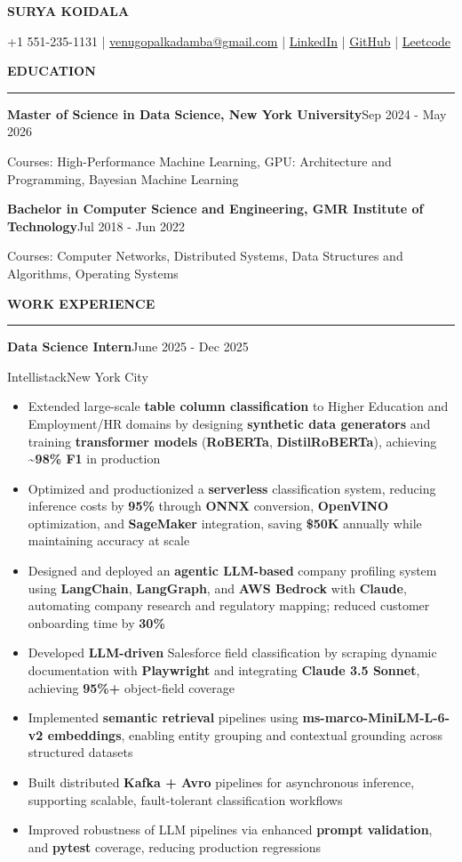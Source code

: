 \documentclass[9pt]{article}
\newcommand{\resumeSection}[1]{%
  \vspace{2pt}%
  \textbf{#1}\par
  \vspace{-5pt}%
  \rule{\linewidth}{0.3pt}\par
  \vspace{0pt}%
}
\newcommand{\resumeRole}[4]{%
  \textbf{#1}\hfill #2\par
  #3\hfill #4\par
}
\newcommand{\resumeSubline}[1]{%
  #1\par
}
\newcommand{\kw}[1]{\textbf{#1}}
\begin{document}
\begin{center}
  {\large \textbf{SURYA  KOIDALA}}\par
  \vspace{0pt}
  +1 551-235-1131 | \href{venugopalkadamba@gmail.com}{venugopalkadamba@gmail.com} | \href{https://linkedin.com/in/venugopalkadamba}{LinkedIn} | \href{http://github.com/venugopalkadamba}{GitHub} | \href{https://leetcode.com/u/venugopalkadamba}{Leetcode}
\end{center}

\resumeSection{EDUCATION}

\resumeSubline{\textbf{Master of Science in Data Science, New York University}\hfill Sep 2024 - May 2026}
\resumeSubline{Courses: High-Performance Machine Learning, GPU: Architecture and Programming, Bayesian Machine Learning}
\resumeSubline{\textbf{Bachelor in Computer Science and Engineering, GMR Institute of Technology}\hfill Jul 2018 - Jun 2022}
\resumeSubline{Courses: Computer Networks, Distributed Systems, Data Structures and Algorithms, Operating Systems}

\resumeSection{WORK EXPERIENCE}

\resumeRole{Data Science Intern}{June 2025 - Dec 2025}{Intellistack}{New York City}
\begin{itemize}
  \item Extended large-scale \kw{table column classification} to Higher Education and Employment/HR domains by designing \kw{synthetic data generators} and training \kw{transformer models} (\kw{RoBERTa}, \kw{DistilRoBERTa}), achieving \kw{\textasciitilde{}98\% F1} in production
  \item Optimized and productionized a \kw{serverless} classification system, reducing inference costs by \kw{95\%} through \kw{ONNX} conversion, \kw{OpenVINO} optimization, and \kw{SageMaker} integration, saving \kw{\$50K} annually while maintaining accuracy at scale
  \item Designed and deployed an \kw{agentic LLM-based} company profiling system using \kw{LangChain}, \kw{LangGraph}, and \kw{AWS Bedrock} with \kw{Claude}, automating company research and regulatory mapping; reduced customer onboarding time by \kw{30\%}
  \item Developed \kw{LLM-driven} Salesforce field classification by scraping dynamic documentation with \kw{Playwright} and integrating \kw{Claude 3.5 Sonnet}, achieving \kw{95\%+} object-field coverage
  \item Implemented \kw{semantic retrieval} pipelines using \kw{ms-marco-MiniLM-L-6-v2 embeddings}, enabling entity grouping and contextual grounding across structured datasets
  \item Built distributed \kw{Kafka + Avro} pipelines for asynchronous inference, supporting scalable, fault-tolerant classification workflows
  \item Improved robustness of LLM pipelines via enhanced \kw{prompt validation}, and \kw{pytest} coverage, reducing production regressions
\end{itemize}
\end{document}
